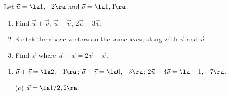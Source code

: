 {Let $\vec u = \la 1,-2\ra$ and $\vec v= \la 1,1\ra$. 
\begin{enumerate}
	\item Find $\vec u+\vec v$, $\vec u-\vec v$, $2\vec u-3\vec v$.
	\item	Sketch the above vectors on the same axes, along with $\vec u$ and $\vec v$.
	\item		Find $\vec x$ where $\vec u+\vec x = 2\vec v-\vec x$.
\end{enumerate}
}
{\begin{enumerate}
	\item $\vec u+\vec v = \la 2,-1\ra$; $\vec u -\vec v = \la0,-3\ra$; $2\vec u-3\vec v = \la -1,-7\ra$.
	\item	[(c)]	$\vec x = \la 1/2,2\ra$.
\end{enumerate}
}
